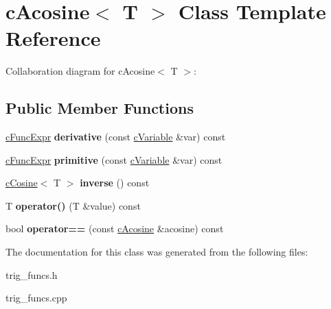 \hypertarget{classcAcosine}{\section{c\-Acosine$<$ T $>$ Class Template Reference}
\label{classcAcosine}
}


Collaboration diagram for c\-Acosine$<$ T $>$\-:
\subsection*{Public Member Functions}
\begin{DoxyCompactItemize}
\item 
\hypertarget{classcAcosine_a9af625296f423a9cea068d718711f0e9}{\hyperlink{classcFuncExpr}{c\-Func\-Expr} {\bfseries derivative} (const \hyperlink{classcVariable}{c\-Variable} \&var) const }\label{classcAcosine_a9af625296f423a9cea068d718711f0e9}

\item 
\hypertarget{classcAcosine_a758246c7733a42252eac3f592f860491}{\hyperlink{classcFuncExpr}{c\-Func\-Expr} {\bfseries primitive} (const \hyperlink{classcVariable}{c\-Variable} \&var) const }\label{classcAcosine_a758246c7733a42252eac3f592f860491}

\item 
\hypertarget{classcAcosine_af9d3e2e5cfd02b87593c181f2157696a}{\hyperlink{classcCosine}{c\-Cosine}$<$ T $>$ {\bfseries inverse} () const }\label{classcAcosine_af9d3e2e5cfd02b87593c181f2157696a}

\item 
\hypertarget{classcAcosine_a9d44969a36b7f84662bc756047a752fe}{T {\bfseries operator()} (T \&value) const }\label{classcAcosine_a9d44969a36b7f84662bc756047a752fe}

\item 
\hypertarget{classcAcosine_aea5aea03820f97a15ccfb6a4e2bcac9e}{bool {\bfseries operator==} (const \hyperlink{classcAcosine}{c\-Acosine} \&acosine) const }\label{classcAcosine_aea5aea03820f97a15ccfb6a4e2bcac9e}

\end{DoxyCompactItemize}


The documentation for this class was generated from the following files\-:\begin{DoxyCompactItemize}
\item 
trig\-\_\-funcs.\-h\item 
trig\-\_\-funcs.\-cpp\end{DoxyCompactItemize}
